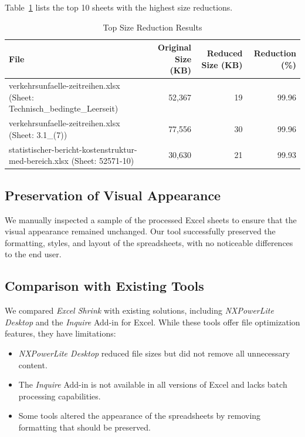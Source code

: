 \documentclass[sigconf]{acmart}
\begin{document}
Table~\ref{tab:top_size_reduction} lists the top 10 sheets with the highest size reductions.

\begin{table}[htbp]
  \caption{Top Size Reduction Results}
  \label{tab:top_size_reduction}
  \centering 
  \begin{tabular}{lrrr}
    \toprule
    \textbf{File} & \textbf{Original Size (KB)} & \textbf{Reduced Size (KB)} & \textbf{Reduction (\%)} \\
    \midrule
    verkehrsunfaelle-zeitreihen.xlsx (Sheet: Technisch\_bedingte\_Leerseit) & 52,367 & 19 & 99.96 \\
    verkehrsunfaelle-zeitreihen.xlsx (Sheet: 3.1\_(7)) & 77,556 & 30 & 99.96 \\
    statistischer-bericht-kostenstruktur-med-bereich.xlsx (Sheet: 52571-10) & 30,630 & 21 & 99.93 \\
    \bottomrule
  \end{tabular}
\end{table}

\subsection{Preservation of Visual Appearance}

We manually inspected a sample of the processed Excel sheets to ensure that the visual appearance remained unchanged. Our tool successfully preserved the formatting, styles, and layout of the spreadsheets, with no noticeable differences to the end user.

\subsection{Comparison with Existing Tools}

We compared \textit{Excel Shrink} with existing solutions, including \textit{NXPowerLite Desktop} and the \textit{Inquire} Add-in for Excel. While these tools offer file optimization features, they have limitations:

\begin{itemize}
    \item \textit{NXPowerLite Desktop} reduced file sizes but did not remove all unnecessary content.
    \item The \textit{Inquire} Add-in is not available in all versions of Excel and lacks batch processing capabilities.
    \item Some tools altered the appearance of the spreadsheets by removing formatting that should be preserved.
\end{itemize}
\end{document}
